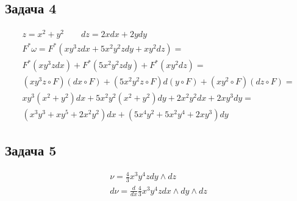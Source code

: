 \subsection*{Задача 4}
	\begin{gather*}
	z = x^2 + y^2\qquad dz = 2xdx + 2ydy\\
	F^* \omega = F^* (xy^3 z dx + 5x^2 y^2 z dy + xy^2 dz) =\\
	F^* (xy^3 z dx) + F^* (5x^2 y^2 z dy) + F^* (x y^2 dz) =\\
	(xy^3 z \circ F)(dx \circ F) + (5x^2 y^2 z \circ F) d(y \circ F) + (xy^2 \circ F)(dz \circ F) =\\
	xy^3(x^2 + y^2)dx + 5x^2 y^2(x^2 + y^2) dy + 2x^2 y^2 dx + 2xy^3 dy =\\
	(x^3 y^3 + x y^5 + 2x^2 y^2)dx + (5x^4 y^2 + 5x^2 y^4 + 2xy^3)dy
	\end{gather*}
\vskip 0.4in


\subsection*{Задача 5}
	\begin{gather*}
	\nu = \frac{4}{3} x^3 y^4 z dy \wedge dz\\
	d \nu = \frac{d}{dx} \frac{4}{3} x^3 y^4 z dx \wedge dy \wedge dz
	\end{gather*}